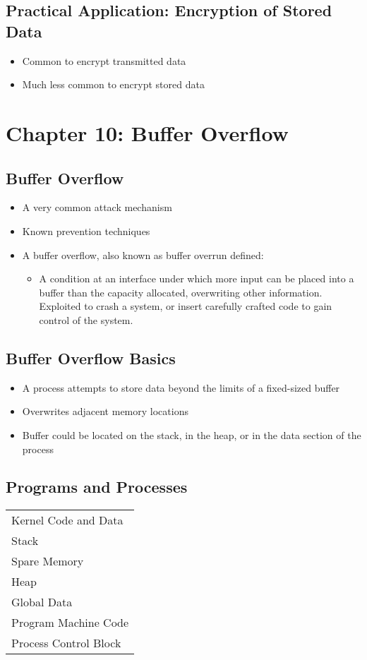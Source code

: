 \documentclass[11pt]{article}
\begin{document}
\subsection{Practical Application: Encryption of Stored Data}
\label{sec:org98bdd74}
\begin{itemize}
\item Common to encrypt transmitted data
\item Much less common to encrypt stored data
\end{itemize}
\section{Chapter 10: Buffer Overflow}
\label{sec:orgee092af}
\subsection{Buffer Overflow}
\label{sec:org0c418cb}
\begin{itemize}
\item A very common attack mechanism
\item Known prevention techniques
\item A buffer overflow, also known as buffer overrun defined:
\begin{itemize}
\item A condition at an interface under which more input can be placed into a buffer than the capacity allocated, overwriting other information. Exploited to crash a system, or insert carefully crafted code to gain control of the system.
\end{itemize}
\end{itemize}
\subsection{Buffer Overflow Basics}
\label{sec:org2629f9c}
\begin{itemize}
\item A process attempts to store data beyond the limits of a fixed-sized buffer
\item Overwrites adjacent memory locations
\item Buffer could be located on the stack, in the heap, or in the data section of the process
\end{itemize}
\subsection{Programs and Processes}
\label{sec:org309c5d3}
\begin{center}
\begin{tabular}{l}
Kernel Code and Data\\
Stack\\
Spare Memory\\
Heap\\
Global Data\\
Program Machine Code\\
Process Control Block\\
\end{tabular}
\end{center}
\end{document}
